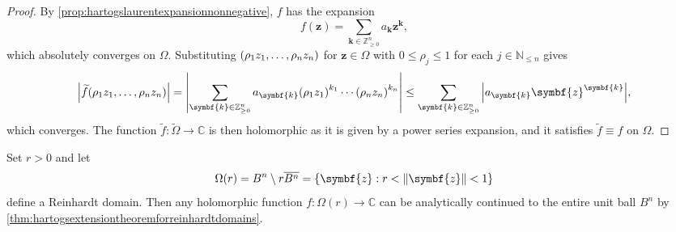 \begin{proof}
    By \cref{prop:hartogslaurentexpansionnonnegative}, \(f\) has the expansion
    \[f(\symbf{z})=\sum_{\symbf{k}\in\mathbb{Z}^n_{\geq 0}}a_{\symbf{k}}\symbf{z}^{\symbf{k}},\] which absolutely converges on \(\Omega\). Substituting
    \(\qty(\rho_1z_1,\dots,\rho_nz_n)\) for \(\symbf{z}\in\Omega\) with
    \(0\leq\rho_j\leq1\) for each \(j\in\mathbb{N}_{\leq n}\) gives
    \[\abs{\widetilde{f}(\rho_1z_1,\dots,\rho_nz_n)}=\abs{\sum_{\symbf{k}\in\mathbb{Z}^n_{\geq 0}}a_{\symbf{k}}\qty(\rho_1z_1)^{k_1}\cdots\qty(\rho_nz_n)^{k_n}}\leq\sum_{\symbf{k}\in\mathbb{Z}^n_{\geq0}}\abs{a_{\symbf{k}}\symbf{z}^{\symbf{k}}},\] which converges. The function \(\widetilde{f}:\widetilde{\Omega}\to\mathbb{C}\)
    is then holomorphic as it is given by a power series expansion, and it
    satisfies \(\widetilde{f}\equiv f\) on \(\Omega\).
\end{proof}
\begin{example}
    Set \(r>0\) and let \[\Omega\qty(r)=B^n\setminus r\overline{B^n}=\cbraces{\symbf{z}}{r<\norm{\symbf{z}}<1}\] define a Reinhardt domain. Then any holomorphic function \(f:\Omega(r)\to\mathbb{C}\) can be analytically continued to the entire unit ball \(B^n\) by \cref{thm:hartogsextensiontheoremforreinhardtdomains}.
\end{example}